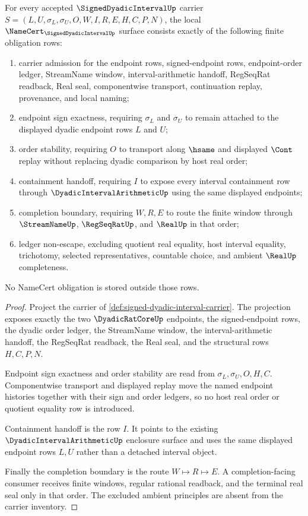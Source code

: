 \begin{theorem}
\label{thm:signed-dyadic-interval-namecert-obligations}
For every accepted $\SignedDyadicIntervalUp$ carrier $S=(L,U,\sigma_L,\sigma_U,O,W,I,R,E,H,C,P,N)$, the local $\NameCert_{\SignedDyadicIntervalUp}$ surface consists exactly of the following finite obligation rows:
\begin{enumerate}
\item carrier admission for the endpoint rows, signed-endpoint rows, endpoint-order ledger, StreamName window, interval-arithmetic handoff, RegSeqRat readback, Real seal, componentwise transport, continuation replay, provenance, and local naming;
\item endpoint sign exactness, requiring $\sigma_L$ and $\sigma_U$ to remain attached to the displayed dyadic endpoint rows $L$ and $U$;
\item order stability, requiring $O$ to transport along $\hsame$ and displayed $\Cont$ replay without replacing dyadic comparison by host real order;
\item containment handoff, requiring $I$ to expose every interval containment row through $\DyadicIntervalArithmeticUp$ using the same displayed endpoints;
\item completion boundary, requiring $W,R,E$ to route the finite window through $\StreamNameUp$, $\RegSeqRatUp$, and $\RealUp$ in that order;
\item ledger non-escape, excluding quotient real equality, host interval equality, trichotomy, selected representatives, countable choice, and ambient $\RealUp$ completeness.
\end{enumerate}
No NameCert obligation is stored outside those rows.
\end{theorem}
\begin{proof}
Project the carrier of \autoref{def:signed-dyadic-interval-carrier}. The projection exposes exactly the two $\DyadicRatCoreUp$ endpoints, the signed-endpoint rows, the dyadic order ledger, the StreamName window, the interval-arithmetic handoff, the RegSeqRat readback, the Real seal, and the structural rows $H,C,P,N$.

Endpoint sign exactness and order stability are read from $\sigma_L,\sigma_U,O,H,C$. Componentwise transport and displayed replay move the named endpoint histories together with their sign and order ledgers, so no host real order or quotient equality row is introduced.

Containment handoff is the row $I$. It points to the existing $\DyadicIntervalArithmeticUp$ enclosure surface and uses the same displayed endpoint rows $L,U$ rather than a detached interval object.

Finally the completion boundary is the route $W \longmapsto R \longmapsto E$. A completion-facing consumer receives finite windows, regular rational readback, and the terminal real seal only in that order. The excluded ambient principles are absent from the carrier inventory.
\end{proof}


